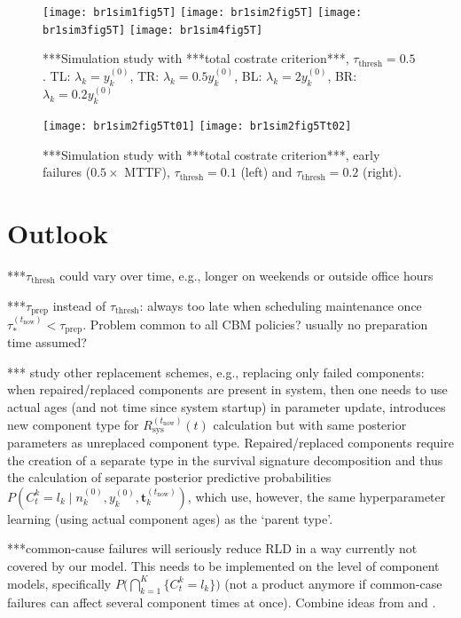\documentclass[authoryear]{elsarticle}
\renewcommand{\vec}[1]{{\bm#1}}
\newcommand{\uz}{^{(0)}} %
\def\ykz{y\uz_k}
\def\nkz{n\uz_k}
\def\tnow{t_\text{now}}
\newcommand{\Rsysnow}{R^{(t_\text{now})}_\text{sys}}
\def\vectknow{\vec{t}_k^{(\tnow)}}
\newcommand{\tausnow}{\tau_*^{(\tnow)}}
\newcommand{\tprep}{\tau_{\text{prep}}}
\newcommand{\tthresh}{\tau_{\text{thresh}}}
\begin{document}
\begin{figure}
\texttt{[image: br1sim1fig5T]}
\texttt{[image: br1sim2fig5T]}
\texttt{[image: br1sim3fig5T]}
\texttt{[image: br1sim4fig5T]}
\caption{***Simulation study with ***total costrate criterion***, $\tthresh = 0.5$.
TL: $\lambda_k =     \ykz$,
TR: $\lambda_k = 0.5 \ykz$,
BL: $\lambda_k = 2   \ykz$,
BR: $\lambda_k = 0.2 \ykz$}
\label{fig:simtotalcostrate05}
\end{figure}

\begin{figure}
\texttt{[image: br1sim2fig5Tt01]}
\texttt{[image: br1sim2fig5Tt02]}
\caption{***Simulation study with ***total costrate criterion***, early failures ($0.5 \times$ MTTF),
$\tthresh = 0.1$ (left) and $\tthresh = 0.2$ (right).}
\label{fig:simtotalcostrate0102}
\end{figure}

\section{Outlook}
\label{sec:outlook}

***$\tthresh$ could vary over time, e.g., longer on weekends or outside office hours

***$\tprep$ instead of $\tthresh$: always too late when scheduling maintenance once $\tausnow < \tprep$.
Problem common to all CBM policies? usually no preparation time assumed?

*** study other replacement schemes, e.g., replacing only failed components:
when repaired/replaced components are present in system,
then one needs to use actual ages (and not time since system startup) in parameter update,
introduces new component type for $\Rsysnow(t)$ calculation but with same posterior parameters as unreplaced component type.
Repaired/replaced components require the creation of a separate type in the survival signature decomposition
and thus the calculation of separate posterior predictive probabilities
$P(C^k_t = l_k \mid \nkz,\ykz,\vectknow)$,
which use, however, the same hyperparameter learning (using actual component ages) as the `parent type'.

***common-cause failures will seriously reduce RLD in a way currently not covered by our model.
This needs to be implemented on the level of component models,
specifically $P\Big( \bigcap_{k=1}^K \{ C^k_t = l_k\} \Big)$ 
(not a product anymore if common-case failures can affect several component times at once).
Combine ideas from \cite{2015:coolen-coolen-maturi} and \cite{Troffaes2014a}.
\end{document}
